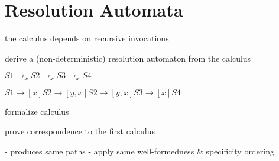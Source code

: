 \section{Resolution Automata}

the calculus depends on recursive invocations

derive a (non-deterministic) resolution automaton from the calculus

$S1 \rightarrow_x S2 \rightarrow_x S3 \rightarrow_x S4$

$S1 \rightarrow [x] S2 \rightarrow [y,x] S2 \rightarrow [y,x] S3 \rightarrow [x] S4$

formalize calculus

prove correspondence to the first calculus

- produces same paths
- apply same well-formedness \& specificity ordering
